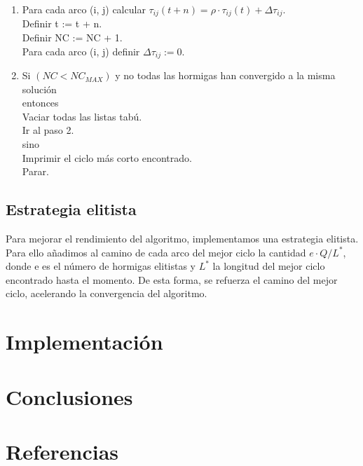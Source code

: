 \documentclass{article}
\begin{document}
\begin{enumerate}
    \hspace*{0.25cm} $\Delta \tau_{ij} := \Delta \tau_{ij} + \Delta \tau_{ij}^{k}$

    \item Para cada arco (i, j) calcular $\tau_{ij}(t+n) = \rho \cdot \tau_{ij}(t) + \Delta \tau_{ij}$. \\
    Definir t := t + n. \\
    Definir NC := NC + 1. \\
    Para cada arco (i, j) definir $\Delta \tau_{ij} := 0$. 

    \item Si $(NC < NC_{MAX})$ y no todas las hormigas han convergido a la misma solución \\
    entonces \\
    \hspace*{0.25cm} Vaciar todas las listas tabú. \\
    \hspace*{0.25cm} Ir al paso 2. \\
    sino \\
    \hspace*{0.25cm} Imprimir el ciclo más corto encontrado. \\
    \hspace*{0.25cm} Parar.

\end{enumerate}

\subsection{Estrategia elitista}

Para mejorar el rendimiento del algoritmo, implementamos una estrategia elitista. 
Para ello añadimos al camino de cada arco del mejor ciclo la cantidad $e \cdot Q/L^{*}$, donde e es el número de hormigas elitistas y $L^{*}$ la longitud del mejor ciclo encontrado hasta el momento.
De esta forma, se refuerza el camino del mejor ciclo, acelerando la convergencia del algoritmo.

\section{Implementación}

\section{Conclusiones}

\section{Referencias}


 
\end{document}
